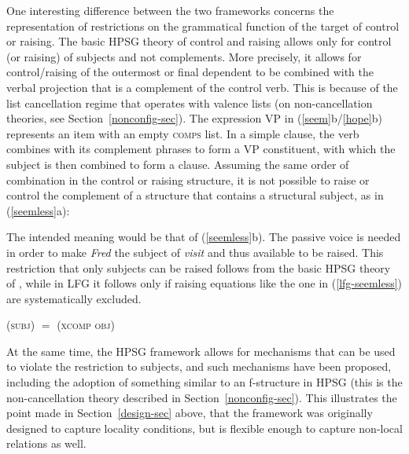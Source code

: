 One interesting difference between the two frameworks concerns the representation of restrictions on the grammatical function of the target of control or raising.   The basic HPSG theory of control and raising \citep[for example, the one presented in][132--145]{ps2} allows only for control (or raising) of subjects and not complements.  More precisely, it allows for control/raising of the outermost or final dependent to be combined with the verbal projection that is a complement of the control verb.  This is because of the list cancellation regime that operates with valence lists (on non-cancellation theories, see Section~\ref{nonconfig-sec}).  The expression VP in  (\ref{seem}b/\ref{hope}b) represents an item with an empty \textsc{comps} list.  In a simple  clause, the verb combines with its complement phrases to form a VP constituent, with which the subject is then combined to form a clause.  Assuming the same order of combination in the control or raising structure, it is not possible to raise or control the complement of a structure that contains a structural subject, as in (\ref{seemless}a):

\begin{exe} 
\ex 
\label{seemless}
\begin{xlist}
\end{xlist}
\end{exe}
The intended meaning would be that of (\ref{seemless}b).  The passive voice is needed in order to make \textit{Fred} the subject of \textit{visit} and thus available to be raised.  This restriction that only subjects can be raised follows from the basic HPSG theory of \citet[132-145]{ps2}, while in LFG it follows only if raising equations like the one in (\ref{lfg-seemless}) are systematically excluded.
\begin{exe} 
\ex 
\label{lfg-seemless}
 {(\up \textsc{subj})  $=$  (\up \textsc{xcomp} \textsc{obj})}
\end{exe}
At the same time, the HPSG framework allows for mechanisms that can be used to violate the restriction to subjects, and such mechanisms have been proposed, including the adoption of something similar to an f-structure in HPSG (this is the non-cancellation theory described in Section~\ref{nonconfig-sec}).  This illustrates the point made in Section~\ref{design-sec} above, that the framework was originally designed to capture locality conditions, but is flexible enough to capture non-local relations as well.  

